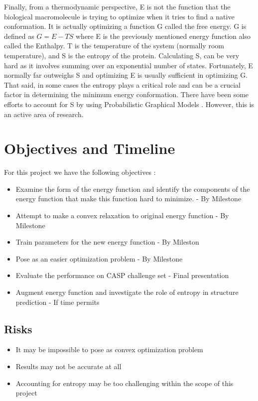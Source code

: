 \documentclass{article} %
\begin{document}
Finally, from a thermodynamic perspective, E is not the function that the biological macromolecule is trying to optimize when it tries to find a native conformation. It is actually optimizing a function G called the free energy. G is defined as $G = E - TS$ where E is the previously mentioned energy function also called the Enthalpy. T is the temperature of the system (normally room temperature), and S is the entropy of the protein. Calculating S, can be very hard as it involves summing over an exponential number of states. Fortunately, E normally far outweighs S and optimizing E is usually sufficient in optimizing G. That said, in some cases the entropy plays a critical role  and can be a crucial factor in determining the minimum energy conformation. There have been some efforts to account for S by using Probabilistic Graphical Models \cite{Hetu2011}. However, this is an active area of research.

\section{Objectives and Timeline}
For this project we have the following objectives : 

\begin{itemize}
\item Examine the form of the energy function and identify the components of the energy function that make this function hard to minimize. - By Milestone
\item Attempt to make a convex relaxation to original energy function - By Milestone
\item Train parameters for the new energy function - By Mileston
\item Pose as an easier optimization problem - By Milestone
\item Evaluate the performance on CASP challenge set - Final presentation
\item Augment energy function and investigate the role of entropy in structure prediction - If time permits
\end{itemize}

\subsection{Risks}
\begin{itemize}
\item It may be impossible to pose as convex optimization problem
\item Results may not be accurate at all
\item Accounting for entropy may be too challenging within the scope of this project
\end{itemize}
\end{document}
